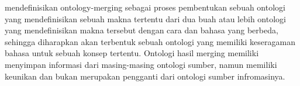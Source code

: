 \citet*{choi} mendefinisikan ontology-merging sebagai proses pembentukan sebuah ontologi yang mendefinisikan sebuah makna tertentu dari dua buah atau lebih ontologi yang mendefinisikan makna tersebut dengan cara dan bahasa yang berbeda, sehingga diharapkan akan terbentuk sebuah ontologi yang memiliki keseragaman bahasa untuk sebuah konsep tertentu. Ontologi hasil merging memiliki menyimpan informasi dari masing-masing ontologi sumber, namun memiliki keunikan dan bukan merupakan pengganti dari ontologi sumber infromasinya.